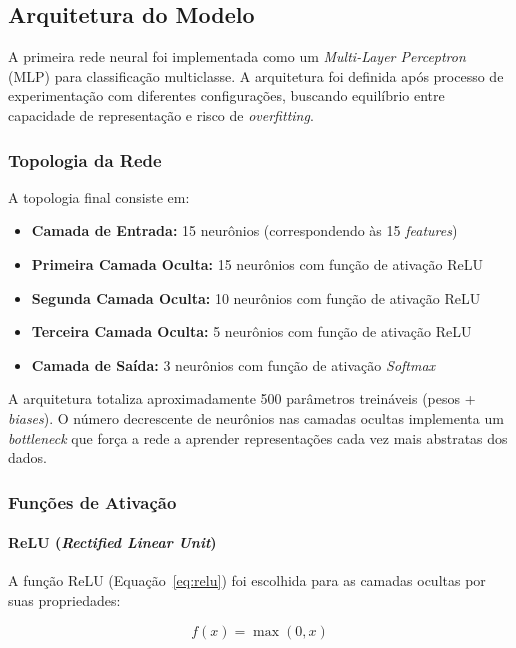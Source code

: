 \subsection{Arquitetura do Modelo}

A primeira rede neural foi implementada como um \textit{Multi-Layer Perceptron} (MLP) para classificação multiclasse. A arquitetura foi definida após processo de experimentação com diferentes configurações, buscando equilíbrio entre capacidade de representação e risco de \textit{overfitting}.

\subsubsection{Topologia da Rede}

A topologia final consiste em:

\begin{itemize}
    \item \textbf{Camada de Entrada:} 15 neurônios (correspondendo às 15 \textit{features})
    \item \textbf{Primeira Camada Oculta:} 15 neurônios com função de ativação ReLU
    \item \textbf{Segunda Camada Oculta:} 10 neurônios com função de ativação ReLU
    \item \textbf{Terceira Camada Oculta:} 5 neurônios com função de ativação ReLU
    \item \textbf{Camada de Saída:} 3 neurônios com função de ativação \textit{Softmax}
\end{itemize}

A arquitetura totaliza aproximadamente 500 parâmetros treináveis (pesos + \textit{biases}). O número decrescente de neurônios nas camadas ocultas implementa um \textit{bottleneck} que força a rede a aprender representações cada vez mais abstratas dos dados.

\subsubsection{Funções de Ativação}

\paragraph{ReLU (\textit{Rectified Linear Unit})}

A função ReLU (Equação~\ref{eq:relu}) foi escolhida para as camadas ocultas por suas propriedades:

\begin{equation}
\label{eq:relu}
f(x) = \max(0, x)
\end{equation}

